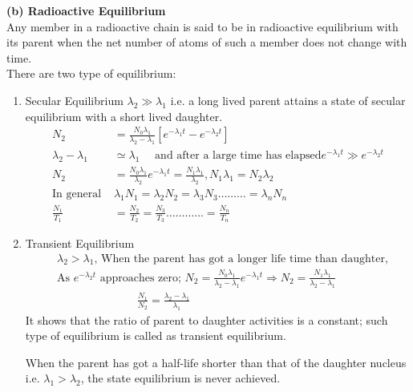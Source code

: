 \textbf{(b) Radioactive Equilibrium}\\
Any member in a radioactive chain is said to be in radioactive equilibrium with its parent when the net number of atoms of such a member does not change with time.\\
There are two type of equilibrium:
\begin{enumerate}
	\item Secular Equilibrium
$\lambda_2 \gg \lambda_1$ i.e. a long lived parent attains a state of secular equilibrium with a short lived daughter.	
	\begin{align*}
	N_2&=\frac{N_0 \lambda_1}{\lambda_2-\lambda_1}\left[e^{-\lambda_1 t}-e^{-\lambda_2 t}\right]\\
	\lambda_2-\lambda_1 &\simeq \lambda_1 \quad\text{ and after a large time has elapsed} e^{-\lambda_1 t} \gg e^{-\lambda_2 t}\\
	N_2&=\frac{N_0 \lambda_1}{\lambda_2} e^{-\lambda_1 t}=\frac{N_1 \lambda_1}{\lambda_2}, N_1 \lambda_1=N_2 \lambda_2\\
	\text{In general }&\lambda_1 N_1=\lambda_2 N_2=\lambda_3 N_3 \ldots \ldots \ldots=\lambda_n N_n\\
	\frac{N_1}{T_1}&=\frac{N_2}{T_2}=\frac{N_3}{T_3} \ldots \ldots \ldots \ldots=\frac{N_n}{T_n}
	\end{align*}
	\item Transient Equilibrium
\begin{align*}
&\text{$\lambda_2>\lambda_1$, When the parent has got a longer life time than daughter,}\\
&\text{As $e^{-\lambda_2 t}$ approaches zero; $N_2=\frac{N_0 \lambda_1}{\lambda_2-\lambda_1} e^{-\lambda_1 t} \Rightarrow N_2=\frac{N_1 \lambda_1}{\lambda_2-\lambda_1}$}\\
&\hspace{3cm} \frac{N_1}{N_2}=\frac{\lambda_2-\lambda_1}{\lambda_1}
\end{align*}
	It shows that the ratio of parent to daughter activities is a constant; such type of equilibrium is called as transient equilibrium.
	
	When the parent has got a half-life shorter than that of the daughter nucleus i.e. $\lambda_1>\lambda_2$, the state equilibrium is never achieved.
\end{enumerate}
